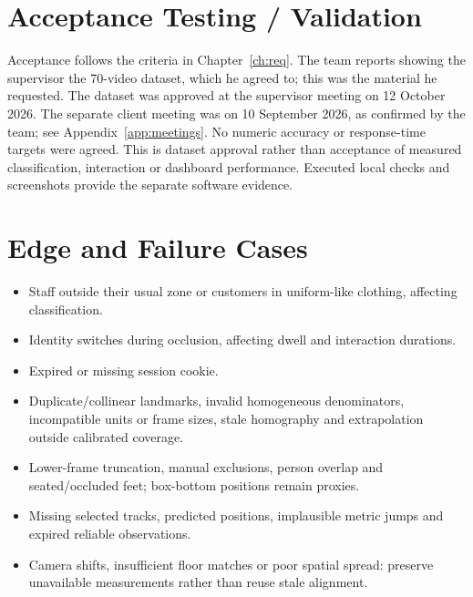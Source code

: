 \section{Acceptance Testing / Validation}
Acceptance follows the criteria in Chapter~\ref{ch:req}. The team reports showing the supervisor the 70-video dataset, which he agreed to; this was the material he requested. The dataset was approved at the supervisor meeting on 12 October 2026. The separate client meeting was on 10 September 2026, as confirmed by the team; see Appendix~\ref{app:meetings}. No numeric accuracy or response-time targets were agreed. This is dataset approval rather than acceptance of measured classification, interaction or dashboard performance. Executed local checks and screenshots provide the separate software evidence.


\section{Edge and Failure Cases}
\begin{itemize}
\item Staff outside their usual zone or customers in uniform-like clothing, affecting classification.
\item Identity switches during occlusion, affecting dwell and interaction durations.
\item Expired or missing session cookie.
\item Duplicate/collinear landmarks, invalid homogeneous denominators, incompatible units or frame sizes, stale homography and extrapolation outside calibrated coverage.
\item Lower-frame truncation, manual exclusions, person overlap and seated/occluded feet; box-bottom positions remain proxies.
\item Missing selected tracks, predicted positions, implausible metric jumps and expired reliable observations.
\item Camera shifts, insufficient floor matches or poor spatial spread: preserve unavailable measurements rather than reuse stale alignment.
\end{itemize}

